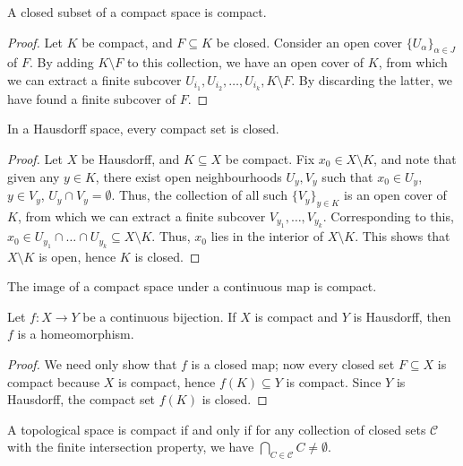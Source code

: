 \documentclass[11pt]{article}
\theoremstyle{definition}
\theoremstyle{remark}
\numberwithin{equation}{section}
\begin{document}
    \begin{lemma}
        A closed subset of a compact space is compact.
    \end{lemma}
    \begin{proof}
        Let $K$ be compact, and $F \subseteq K$ be closed. Consider an open cover
        $\{U_\alpha\}_{\alpha \in J}$ of $F$. By adding $K\setminus F$ to this
        collection, we have an open cover of $K$, from which we can extract a finite
        subcover $U_{i_1}, U_{i_2}, \dots, U_{i_k}, K\setminus F$. By discarding the
        latter, we have found a finite subcover of $F$.
    \end{proof}

    \begin{lemma}
        In a Hausdorff space, every compact set is closed.
    \end{lemma}
    \begin{proof}
        Let $X$ be Hausdorff, and $K \subseteq X$ be compact. Fix $x_0 \in X\setminus
        K$, and note that given any $y \in K$, there exist open neighbourhoods $U_y,
        V_y$ such that $x_0 \in U_y$, $y \in V_y$, $U_y \cap V_y = \emptyset$. Thus,
        the collection of all such $\{V_y\}_{y \in K}$ is an open cover of $K$, from
        which we can extract a finite subcover $V_{y_1}, \dots, V_{y_k}$.
        Corresponding to this, $x_0 \in U_{y_1} \cap \dots \cap U_{y_k} \subseteq X
        \setminus K$. Thus, $x_0$ lies in the interior of $X\setminus K$. This shows
        that $X \setminus K$ is open, hence $K$ is closed.
    \end{proof}

    \begin{theorem}
        The image of a compact space under a continuous map is compact.
    \end{theorem}

    \begin{lemma}
        Let $f\colon X \to Y$ be a continuous bijection. If $X$ is compact and $Y$ is
        Hausdorff, then $f$ is a homeomorphism.
    \end{lemma}
    \begin{proof}
        We need only show that $f$ is a closed map; now every closed set $F \subseteq
        X$ is compact because $X$ is compact, hence $f(K) \subseteq Y$ is compact.
        Since $Y$ is Hausdorff, the compact set $f(K)$ is closed.
    \end{proof}

    \begin{lemma}
        A topological space is compact if and only if for any collection of closed
        sets $\mathscr{C}$ with the finite intersection property, we have $\bigcap_{C
        \in \mathscr{C}} C \neq \emptyset$.
    \end{lemma}
\end{document}

